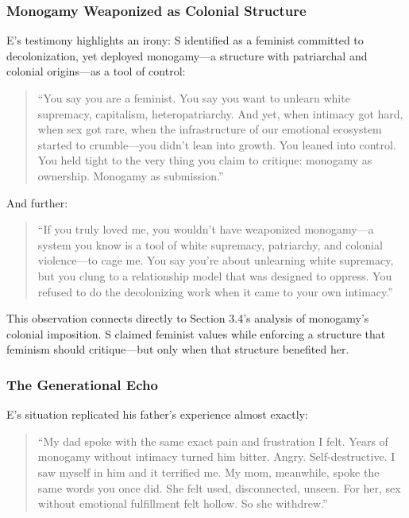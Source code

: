 \documentclass[12pt, letterpaper]{article}
\begin{document}
\subsubsection{Monogamy Weaponized as Colonial Structure}

E's testimony highlights an irony: S identified as a feminist committed to decolonization, yet deployed monogamy---a structure with patriarchal and colonial origins---as a tool of control:

\begin{quote}
``You say you are a feminist. You say you want to unlearn white supremacy, capitalism, heteropatriarchy. And yet, when intimacy got hard, when sex got rare, when the infrastructure of our emotional ecosystem started to crumble---you didn't lean into growth. You leaned into control. You held tight to the very thing you claim to critique: monogamy as ownership. Monogamy as submission.''
\end{quote}

And further:

\begin{quote}
``If you truly loved me, you wouldn't have weaponized monogamy---a system you know is a tool of white supremacy, patriarchy, and colonial violence---to cage me. You say you're about unlearning white supremacy, but you clung to a relationship model that was designed to oppress. You refused to do the decolonizing work when it came to your own intimacy.''
\end{quote}

This observation connects directly to Section 3.4's analysis of monogamy's colonial imposition. S claimed feminist values while enforcing a structure that feminism should critique---but only when that structure benefited her.

\subsubsection{The Generational Echo}

E's situation replicated his father's experience almost exactly:

\begin{quote}
``My dad spoke with the same exact pain and frustration I felt. Years of monogamy without intimacy turned him bitter. Angry. Self-destructive. I saw myself in him and it terrified me. My mom, meanwhile, spoke the same words you once did. She felt used, disconnected, unseen. For her, sex without emotional fulfillment felt hollow. So she withdrew.''
\end{quote}
\end{document}
